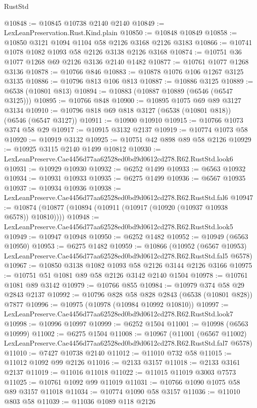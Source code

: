 \begin{lexlean}{RustStd}
\begin{coremodule}
@10848 := @10845 @10738 @2140 @2140
@10849 := LexLeanPreservation.Rust.Kind.plain
@10850 := @10848 @10849
@10858 := @10850 @3121 @1094 @1104 @58 @2126 @3168 @2126 @3183
@10866 := @10741 @1078 @1082 @1093 @58 @2126 @3138 @2126 @3168
@10874 := @10751 @36 @1077 @1268 @69 @2126 @3136 @2140 @1482
@10877 := @10761 @1077 @1268 @3136
@10878 := @10766 @846
@10883 := @10878 @1076 @106 @1267 @3125 @3135
@10886 := @10796 @813 @106 @813
@10887 := @10886 @3125
@10889 := @6538 (@10801 @813)
@10894 := @10883 (@10887 @10889 (@6546 (@6547 @3125)))
@10895 := @10766 @848
@10900 := @10895 @1075 @69 @89 @3127 @3134
@10910 := @10796 @818 @69 @818 @3127 (@6538 (@10801 @818)) (@6546 (@6547 @3127))
@10911 := @10900 @10910
@10915 := @10766 @1073 @374 @58 @29
@10917 := @10915 @3132 @2137
@10919 := @10774 @1073 @58
@10920 := @10919 @3132
@10925 := @10751 @42 @898 @89 @58 @2126
@10929 := @10925 @3115 @2140 @1499 @10812
@10930 := LexLeanPreserve.Cae4456d77aa62528ed0bd9d0612cd278.R62.RustStd.look6
@10931 := @10929 @10930
@10932 := @6252 @1499
@10933 := @6563 @10932
@10934 := @10931 @10933
@10935 := @6275 @1499
@10936 := @6567 @10935
@10937 := @10934 @10936
@10938 := LexLeanPreserve.Cae4456d77aa62528ed0bd9d0612cd278.R62.RustStd.fal6
@10947 := @10874 (@10877 (@10894 (@10911 (@10917 (@10920 (@10937 @10938 @6578)) @10810))))
@10948 := LexLeanPreserve.Cae4456d77aa62528ed0bd9d0612cd278.R62.RustStd.look5
@10949 := @10947 @10948
@10950 := @6252 @1482
@10952 := @10949 (@6563 @10950)
@10953 := @6275 @1482
@10959 := @10866
    (@10952 (@6567 @10953) LexLeanPreserve.Cae4456d77aa62528ed0bd9d0612cd278.R62.RustStd.fal5 @6578)
@10967 := @10850 @3138 @1082 @1093 @58 @2126 @3144 @2126 @3166
@10975 := @10751 @51 @1081 @89 @58 @2126 @3142 @2140 @1504
@10978 := @10761 @1081 @89 @3142
@10979 := @10766 @855
@10984 := @10979 @374 @58 @29 @2843 @2137
@10992 := @10796 @828 @58 @828 @2843 (@6538 (@10801 @828)) @7877
@10996 := @10975 (@10978 (@10984 @10992 @10810))
@10997 := LexLeanPreserve.Cae4456d77aa62528ed0bd9d0612cd278.R62.RustStd.look7
@10998 := @10996 @10997
@10999 := @6252 @1504
@11001 := @10998 (@6563 @10999)
@11002 := @6275 @1504
@11008 := @10967
    (@11001 (@6567 @11002) LexLeanPreserve.Cae4456d77aa62528ed0bd9d0612cd278.R62.RustStd.fal7 @6578)
@11010 := @7427 @10738 @2140
@11012 := @11010 @732 @58
@11015 := @11012 @1092 @99 @2126
@11016 := @2133 @3157
@11018 := @2133 @3161 @2137
@11019 := @11016 @11018
@11022 := @11015 @11019 @3003 @7573
@11025 := @10761 @1092 @99 @11019
@11031 := @10766 @1090 @1075 @58 @89 @3157 @11018
@11034 := @10774 @1090 @58 @3157
@11036 := @11010 @803 @58
@11039 := @11036 @1089 @118 @2126

\end{coremodule}
\end{lexlean}
